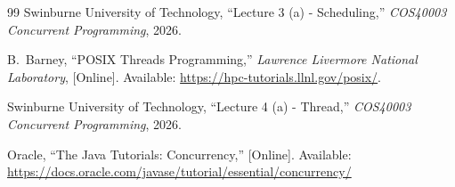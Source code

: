 \documentclass[11pt,a4paper]{article}
\begin{document}
\begin{thebibliography}{99}
Swinburne University of Technology, ``Lecture 3 (a) - Scheduling,'' \emph{COS40003 Concurrent Programming}, 2026.

B.~Barney, ``POSIX Threads Programming,'' \emph{Lawrence Livermore National Laboratory}, [Online]. Available: \url{https://hpc-tutorials.llnl.gov/posix/}.

Swinburne University of Technology, ``Lecture 4 (a) - Thread,'' \emph{COS40003 Concurrent Programming}, 2026.

Oracle, ``The Java Tutorials: Concurrency,'' [Online]. Available: \url{https://docs.oracle.com/javase/tutorial/essential/concurrency/}

\end{thebibliography}
\end{document}
